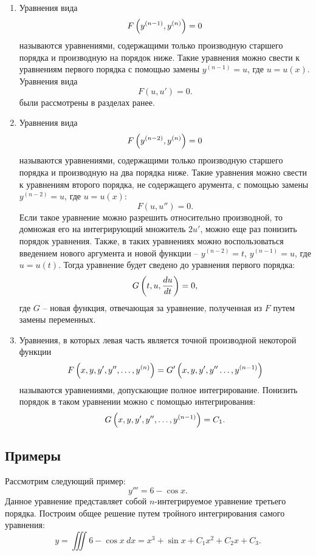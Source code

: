 \begin{enumerate}
		\item Уравнения вида
			\[ F\left( y^{(n-1)}, y^{(n)} \right) = 0 \]
			называются уравнениями, содержащими только производную старшего порядка и производную на порядок ниже. Такие уравнения можно свести к уравнениям первого порядка с помощью замены $y^{(n-1)} = u$, где $u = u(x)$. Уравнения вида 
			\[ F(u, u') = 0. \]
			были рассмотрены в разделах ранее.

		\item Уравнения вида
			\[ F\left( y^{(n-2)}, y^{(n)} \right) = 0 \]
			называются уравнениями, содержащими только производную старшего порядка и производную на два порядка ниже. Такие уравнения можно свести к уравнениям второго порядка, не содержащего арумента, с помощью замены $y^{(n-2)} = u$, где $u = u(x)$:
			\[ F(u, u'') = 0. \]
			Если такое уравнение можно разрешить относительно производной, то домножая его на интегрирующий множитель $2u'$, можно еще раз понизить порядок уравнения. Также, в таких уравнениях можно воспользоваться введением нового аргумента и новой функции -- $y^{(n-2)} = t$, $y^{(n-1)} = u$, где $u = u(t)$. Тогда уравнение будет сведено до уравнения первого порядка:
			\[ G\left( t, u, \dfrac{d u}{d t} \right) = 0, \] 
			где $G$ -- новая функция, отвечающая за уравнение, полученная из $F$ путем замены переменных.

		\item Уравнения, в которых левая часть является точной производной некоторой функции
			\[ F\left( x, y, y', y'', \dots, y^{(n)} \right) = G'\left( x, y, y', y'' \dots, y^{(n-1)} \right) \]
			называются уравнениями, допускающие полное интегрирование. Понизить порядок в таком уравнении можно с помощью интегрирования:
			\[ G\left( x, y, y', y'', \dots, y^{(n-1)} \right) = C_1. \]

	\end{enumerate}

	\subsection{Примеры}

		Рассмотрим следующий пример:
		\[ y''' = 6 - \cos{x}. \]
		Данное уравнение представляет собой $n$-интегрируемое уравнение третьего порядка. Построим общее решение путем тройного интегрирования самого уравнения:
		\[ y = \iiint 6 - \cos{x} ~ dx = x^3 + \sin{x} + C_1x^2 + C_2x + C_3. \]

